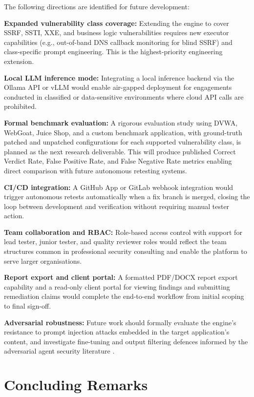 The following directions are identified for future development:

\textbf{Expanded vulnerability class coverage:} Extending the engine to cover SSRF, SSTI, XXE, and business logic vulnerabilities requires new executor capabilities (e.g., out-of-band DNS callback monitoring for blind SSRF) and class-specific prompt engineering. This is the highest-priority engineering extension.

\textbf{Local LLM inference mode:} Integrating a local inference backend via the Ollama API or vLLM would enable air-gapped deployment for engagements conducted in classified or data-sensitive environments where cloud API calls are prohibited.

\textbf{Formal benchmark evaluation:} A rigorous evaluation study using DVWA, WebGoat, Juice Shop, and a custom benchmark application, with ground-truth patched and unpatched configurations for each supported vulnerability class, is planned as the next research deliverable. This will produce published Correct Verdict Rate, False Positive Rate, and False Negative Rate metrics enabling direct comparison with future autonomous retesting systems.

\textbf{CI/CD integration:} A GitHub App or GitLab webhook integration would trigger autonomous retests automatically when a fix branch is merged, closing the loop between development and verification without requiring manual tester action.

\textbf{Team collaboration and RBAC:} Role-based access control with support for lead tester, junior tester, and quality reviewer roles would reflect the team structures common in professional security consulting and enable the platform to serve larger organisations.

\textbf{Report export and client portal:} A formatted PDF/DOCX report export capability and a read-only client portal for viewing findings and submitting remediation claims would complete the end-to-end workflow from initial scoping to final sign-off.

\textbf{Adversarial robustness:} Future work should formally evaluate the engine's resistance to prompt injection attacks embedded in the target application's content, and investigate fine-tuning and output filtering defences informed by the adversarial agent security literature \cite{ai_agents_under_threat2024}.

\section{Concluding Remarks}

